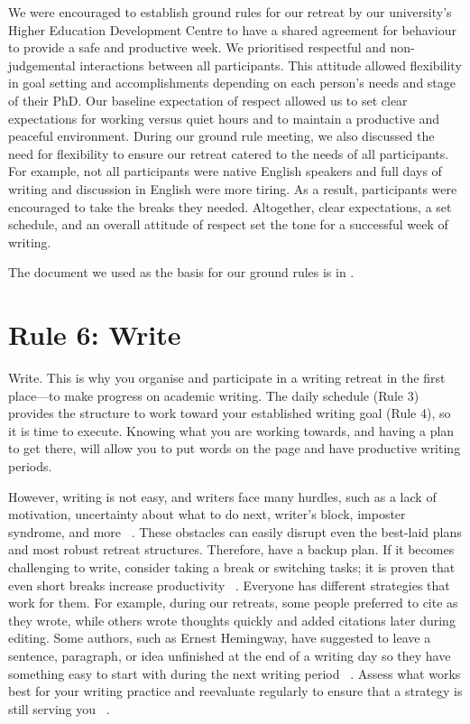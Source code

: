 \documentclass[10pt,letterpaper]{article}
\begin{document}
We were encouraged to establish ground rules for our retreat by our university's Higher Education Development Centre to have a shared agreement for behaviour to provide a safe and productive week. We prioritised respectful and non-judgemental interactions between all participants. This attitude allowed flexibility in goal setting and accomplishments depending on each person's needs and stage of their PhD. Our baseline expectation of respect allowed us to set clear expectations for working versus quiet hours and to maintain a productive and peaceful environment. During our ground rule meeting, we also discussed the need for flexibility to ensure our retreat catered to the needs of all participants. For example, not all participants were native English speakers and full days of writing and discussion in English were more tiring. As a result, participants were encouraged to take the breaks they needed. Altogether, clear expectations, a set schedule, and an overall attitude of respect set the tone for a successful week of writing. 

The document we used as the basis for our ground rules is in .

\section*{Rule 6: Write}

Write. This is why you organise and participate in a writing retreat in the first place---to make progress on academic writing. The daily schedule (Rule 3) provides the structure to work toward your established writing goal (Rule 4), so it is time to execute. Knowing what you are working towards, and having a plan to get there, will allow you to put words on the page and have productive writing periods.

However, writing is not easy, and writers face many hurdles, such as a lack of motivation, uncertainty about what to do next, writer's block, imposter syndrome, and more ~\cite{boice1984, murray2013, wilson2019, grogan2021}. These obstacles can easily disrupt even the best-laid plans and most robust retreat structures. Therefore, have a backup plan. If it becomes challenging to write, consider taking a break or switching tasks; it is proven that even short breaks increase productivity ~\cite{carter2020, lyubykh2022}. Everyone has different strategies that work for them. For example, during our retreats, some people preferred to cite as they wrote, while others wrote thoughts quickly and added citations later during editing. Some authors, such as Ernest Hemingway, have suggested to leave a sentence, paragraph, or idea unfinished at the end of a writing day so they have something easy to start with during the next writing period ~\cite{hemingway1935}. Assess what works best for your writing practice and reevaluate regularly to ensure that a strategy is still serving you ~\cite{peterson2018, grogan2021}.
\end{document}
